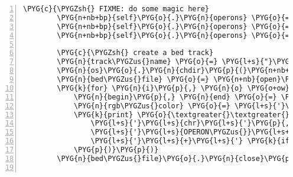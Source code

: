 \begin{Verbatim}[commandchars=\\\{\},numbers=left,firstnumber=1,stepnumber=5]
        \PYG{c}{\PYGZsh{} FIXME: do some magic here}
        \PYG{n+nb+bp}{self}\PYG{o}{.}\PYG{n}{operons} \PYG{o}{=} \PYG{n}{Operon}\PYG{p}{(}\PYG{n}{begin}\PYG{o}{=}\PYG{l+m+mi}{0}\PYG{p}{,} \PYG{n}{end}\PYG{o}{=}\PYG{l+m+mi}{100}\PYG{p}{,} \PYG{n}{strand}\PYG{o}{=}\PYG{l+m+mi}{1}\PYG{p}{,} \PYG{n}{confidence}\PYG{o}{=}\PYG{l+m+mi}{10}\PYG{p}{)}\PYG{p}{,}
        \PYG{n+nb+bp}{self}\PYG{o}{.}\PYG{n}{operons} \PYG{o}{=} \PYG{n}{Operon}\PYG{p}{(}\PYG{n}{begin}\PYG{o}{=}\PYG{l+m+mi}{200}\PYG{p}{,} \PYG{n}{end}\PYG{o}{=}\PYG{l+m+mi}{300}\PYG{p}{,} \PYG{n}{strand}\PYG{o}{=}\PYG{l+m+mi}{1}\PYG{p}{,} \PYG{n}{confidence}\PYG{o}{=}\PYG{l+m+mi}{50}\PYG{p}{)}\PYG{p}{,}
        \PYG{n+nb+bp}{self}\PYG{o}{.}\PYG{n}{operons} \PYG{o}{=} \PYG{n}{Operon}\PYG{p}{(}\PYG{n}{begin}\PYG{o}{=}\PYG{l+m+mi}{400}\PYG{p}{,} \PYG{n}{end}\PYG{o}{=}\PYG{l+m+mi}{500}\PYG{p}{,} \PYG{n}{strand}\PYG{o}{=}\PYG{l+m+mi}{1}\PYG{p}{,} \PYG{n}{confidence}\PYG{o}{=}\PYG{l+m+mi}{100}\PYG{p}{)}\PYG{p}{,}

        \PYG{c}{\PYGZsh{} create a bed track}
        \PYG{n}{track\PYGZus{}name} \PYG{o}{=} \PYG{l+s}{"}\PYG{l+s}{rna-seqlyze-operon\PYGZus{}predictions}\PYG{l+s}{"}
        \PYG{n}{os}\PYG{o}{.}\PYG{n}{chdir}\PYG{p}{(}\PYG{n+nb+bp}{self}\PYG{o}{.}\PYG{n}{analysis}\PYG{o}{.}\PYG{n}{data\PYGZus{}dir}\PYG{p}{)}
        \PYG{n}{bed\PYGZus{}file} \PYG{o}{=} \PYG{n+nb}{open}\PYG{p}{(}\PYG{n}{track\PYGZus{}name} \PYG{o}{+} \PYG{l+s}{"}\PYG{l+s}{.bed}\PYG{l+s}{"}\PYG{p}{,} \PYG{l+s}{"}\PYG{l+s}{w}\PYG{l+s}{"}\PYG{p}{)}
        \PYG{k}{for} \PYG{n}{i}\PYG{p}{,} \PYG{n}{o} \PYG{o+ow}{in} \PYG{n+nb}{enumerate}\PYG{p}{(}\PYG{n+nb+bp}{self}\PYG{o}{.}\PYG{n}{operons}\PYG{p}{)}\PYG{p}{:}
            \PYG{n}{begin}\PYG{p}{,} \PYG{n}{end} \PYG{o}{=} \PYG{n+nb}{str}\PYG{p}{(}\PYG{n}{o}\PYG{o}{.}\PYG{n}{begin}\PYG{p}{)}\PYG{p}{,} \PYG{n+nb}{str}\PYG{p}{(}\PYG{n}{o}\PYG{o}{.}\PYG{n}{end}\PYG{p}{)}
            \PYG{n}{rgb\PYGZus{}color} \PYG{o}{=} \PYG{l+s}{'}\PYG{l+s}{,}\PYG{l+s}{'}\PYG{o}{.}\PYG{n}{join}\PYG{p}{(}\PYG{p}{(}\PYG{n+nb}{str}\PYG{p}{(}\PYG{l+m+mi}{100} \PYG{o}{-} \PYG{n+nb}{int}\PYG{p}{(}\PYG{n}{o}\PYG{o}{.}\PYG{n}{confidence}\PYG{p}{)}\PYG{p}{)}\PYG{p}{,}\PYG{p}{)}\PYG{o}{*}\PYG{l+m+mi}{3}\PYG{p}{)}
            \PYG{k}{print} \PYG{o}{\textgreater{}\textgreater{}} \PYG{n}{bed\PYGZus{}file}\PYG{p}{,} \PYG{l+s}{'}\PYG{l+s+se}{\PYGZbs{}t}\PYG{l+s}{'}\PYG{o}{.}\PYG{n}{join}\PYG{p}{(}\PYG{p}{(}
                \PYG{l+s}{'}\PYG{l+s}{chr}\PYG{l+s}{'}\PYG{p}{,} \PYG{n}{begin}\PYG{p}{,} \PYG{n}{end}\PYG{p}{,}
                \PYG{l+s}{'}\PYG{l+s}{OPERON\PYGZus{}}\PYG{l+s+si}{\PYGZpc{}d}\PYG{l+s}{'} \PYG{o}{\PYGZpc{}} \PYG{n}{i}\PYG{p}{,} \PYG{n+nb}{str}\PYG{p}{(}\PYG{n}{o}\PYG{o}{.}\PYG{n}{confidence}\PYG{p}{)}\PYG{p}{,}
                \PYG{l+s}{'}\PYG{l+s}{+}\PYG{l+s}{'} \PYG{k}{if} \PYG{n}{o}\PYG{o}{.}\PYG{n}{strand} \PYG{o}{\textgreater{}} \PYG{l+m+mi}{0} \PYG{k}{else} \PYG{l+s}{'}\PYG{l+s}{-}\PYG{l+s}{'}\PYG{p}{,} \PYG{n}{begin}\PYG{p}{,} \PYG{n}{end}\PYG{p}{,} \PYG{n}{rgb\PYGZus{}color}
            \PYG{p}{)}\PYG{p}{)}
        \PYG{n}{bed\PYGZus{}file}\PYG{o}{.}\PYG{n}{close}\PYG{p}{(}\PYG{p}{)}


\end{Verbatim}
